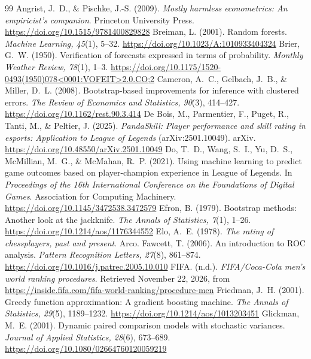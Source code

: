 \documentclass[12pt,a4paper]{article}
\begin{document}
\begin{thebibliography}{99}
\setlength{\itemsep}{0.35em}\small
{} Angrist, J.~D., \& Pischke, J.-S. (2009). \emph{Mostly harmless econometrics: An empiricist's companion}. Princeton University Press. \url{https://doi.org/10.1515/9781400829828}
 Breiman, L. (2001). Random forests. \emph{Machine Learning, 45}(1), 5--32. \url{https://doi.org/10.1023/A:1010933404324}
 Brier, G.~W. (1950). Verification of forecasts expressed in terms of probability. \emph{Monthly Weather Review, 78}(1), 1--3. \url{https://doi.org/10.1175/1520-0493(1950)078<0001:VOFEIT>2.0.CO;2}
 Cameron, A.~C., Gelbach, J.~B., \& Miller, D.~L. (2008). Bootstrap-based improvements for inference with clustered errors. \emph{The Review of Economics and Statistics, 90}(3), 414--427. \url{https://doi.org/10.1162/rest.90.3.414}
 De Bois, M., Parmentier, F., Puget, R., Tanti, M., \& Peltier, J. (2025). \emph{PandaSkill: Player performance and skill rating in esports: Application to League of Legends} (arXiv:2501.10049). arXiv. \url{https://doi.org/10.48550/arXiv.2501.10049}
 Do, T.~D., Wang, S.~I., Yu, D.~S., McMillian, M.~G., \& McMahan, R.~P. (2021). Using machine learning to predict game outcomes based on player-champion experience in League of Legends. In \emph{Proceedings of the 16th International Conference on the Foundations of Digital Games}. Association for Computing Machinery. \url{https://doi.org/10.1145/3472538.3472579}
 Efron, B. (1979). Bootstrap methods: Another look at the jackknife. \emph{The Annals of Statistics, 7}(1), 1--26. \url{https://doi.org/10.1214/aos/1176344552}
 Elo, A.~E. (1978). \emph{The rating of chessplayers, past and present}. Arco.
 Fawcett, T. (2006). An introduction to ROC analysis. \emph{Pattern Recognition Letters, 27}(8), 861--874. \url{https://doi.org/10.1016/j.patrec.2005.10.010}
 FIFA. (n.d.). \emph{FIFA/Coca-Cola men's world ranking procedures}. Retrieved November 22, 2026, from \url{https://inside.fifa.com/fifa-world-ranking/procedure-men}
 Friedman, J.~H. (2001). Greedy function approximation: A gradient boosting machine. \emph{The Annals of Statistics, 29}(5), 1189--1232. \url{https://doi.org/10.1214/aos/1013203451}
 Glickman, M.~E. (2001). Dynamic paired comparison models with stochastic variances. \emph{Journal of Applied Statistics, 28}(6), 673--689. \url{https://doi.org/10.1080/02664760120059219}

\end{thebibliography}
\end{document}
